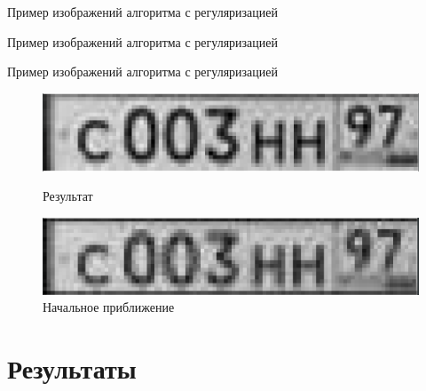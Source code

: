 \begin{frame}{Пример изображений алгоритма с регуляризацией}
  
\end{frame}

\begin{frame}{Пример изображений алгоритма с регуляризацией}
  
\end{frame}

\begin{frame}{Пример изображений алгоритма с регуляризацией}
  \begin{figure}
    \caption{Результат}
    \includegraphics[width=\columnwidth]{content/sr2_two_1.png}\\
  \end{figure}
  \begin{figure}
    \caption{Начальное приближение}
    \includegraphics[width=\columnwidth]{content/sr2_two_2.png}
  \end{figure}
\end{frame}

\section{Результаты}

